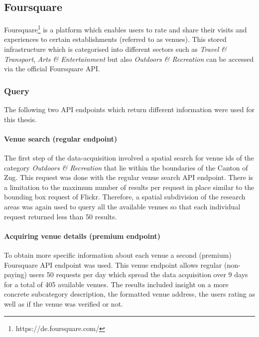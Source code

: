\subsection{Foursquare} \label{foursquare}
Foursquare\footnote{https://de.foursquare.com/} is a platform which enables users to rate and share their visits and experiences to certain establishments (referred to as venues). This stored infrastructure which is categorised into different sectors such as \textit{Travel \& Transport}, \textit{Arts \& Entertainment} but also \textit{Outdoors \& Recreation} can be accessed via the official Foursquare API.

\subsubsection*{Query} \label{foursquare_query}
The following two API endpoints which return different information were used for this thesis.
\paragraph*{Venue search (regular endpoint)} \label{foursquare_endpoint1}
The first step of the data-acquisition involved a spatial search for venue ids of the category \textit{Outdoors \& Recreation} that lie within the boundaries of the Canton of Zug. This request was done with the regular venue search API endpoint. There is a limitation to the maximum number of results per request in place similar to the bounding box request of Flickr. Therefore, a spatial subdivision of the research areas was again used to query all the available venues so that each individual request returned less than 50 results.
\paragraph*{Acquiring venue details (premium endpoint)} \label{foursquare_endpoint2}
To obtain more specific information about each venue a second (premium) Foursquare API endpoint was used. This venue endpoint allows regular (non-paying) users 50 requests per day which spread the data acquisition over 9 days for a total of 405 available venues. The results included insight on a more concrete subcategory description, the formatted venue address, the users rating as well as if the venue was verified or not.

